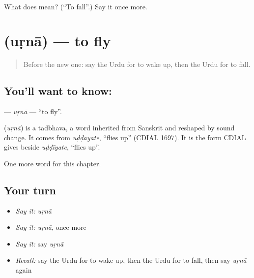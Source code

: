 \begin{tcolorbox}[breakable,colback=teal!4,colframe=teal!35!black,title={Before you move on}]
What does  mean? (\textquotedblleft{}To fall\textquotedblright{}.) Say it once more.
\end{tcolorbox}
\section[\texorpdfstring{\ur{اڑنا} (uṛnā)}{اڑنا (uṛnā)}]{ (uṛnā) — to fly}

\label{lesson:UR-C138-urna}



\begin{quote}
Before the new one: say the Urdu for to wake up, then the Urdu for to fall.
\end{quote}

\subsection*{You'll want to know: }
\textbf{} — \emph{uṛnā} — \textquotedblleft{}to fly\textquotedblright{}.

\begin{cousinweb}
\textbf{} (\emph{uṛnā}) is a tadbhava, a word inherited from Sanskrit and reshaped by sound change. It comes from \emph{uḍḍayate}, \textquotedblleft{}flies up\textquotedblright{} (CDIAL 1697). It is the form CDIAL gives beside \emph{uḍḍīyate}, \textquotedblleft{}flies up\textquotedblright{}.
\end{cousinweb}

\begin{grammarlens}[title={What you've built}]
One more word for this chapter.
\end{grammarlens}

\subsection*{Your turn}
\begin{itemize}
\raggedright
  \item \emph{Say it:} \emph{uṛnā}
  \item \emph{Say it:} \emph{uṛnā}, once more
  \item \emph{Say it:} say \emph{uṛnā}
  \item \emph{Recall:} say the Urdu for to wake up, then the Urdu for to fall, then say \emph{uṛnā} again
\end{itemize}

